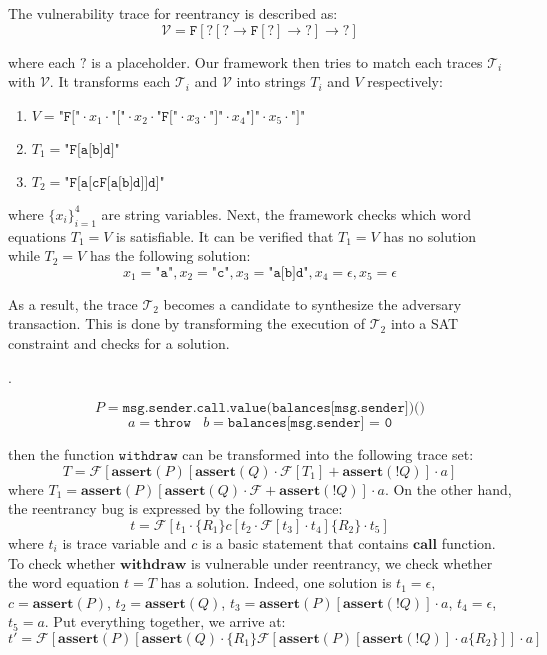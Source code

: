 \documentclass[runningheads]{llncs}
\newcommand{\code}[1]{\texttt{#1}}
\begin{document}
The vulnerability trace for reentrancy is described as:
$$
\mathcal{V} = \code{F}[?[? \rightarrow \code{F}[?] \rightarrow ?] \rightarrow ?]
$$

where each $?$ is a placeholder. Our framework then tries to match each traces $\mathcal{T}_i$ with $\mathcal{V}$. It transforms each $\mathcal{T}_i$ and $\mathcal{V}$ into strings $T_i$ and $V$ respectively:
\begin{enumerate}
	\item $V = \code{"F["} \cdot x_1 \cdot \code{"["} \cdot x_2 \cdot \code{"F["} \cdot x_3 \cdot \code{"]"} \cdot x_4 \code{"]"} \cdot x_5 \cdot  \code{"]"}$
	\item $T_1 = \code{"F[a[b]d]"}$
	\item $T_2 = \code{"F[a[cF[a[b]d]]d]"}$
\end{enumerate}
where $\{x_i\}_{i=1}^4$ are string variables. Next, the framework checks which word equations $T_1 = V$ is satisfiable. It can be verified that $T_1 = V$ has no solution while $T_2 = V$ has the following solution:
$$
x_1 = \code{"a"}, x_2 =  \code{"c"}, x_3 = \code{"a[b]d"}, x_4 = \epsilon, x_5 = \epsilon
$$

As a result, the trace $\mathcal{T}_2$ becomes a candidate to synthesize the adversary transaction. This is done by transforming the execution of $\mathcal{T}_2$ into a SAT constraint and checks for a solution.

.

$$P = \texttt{msg.sender.call.value(balances[msg.sender])()}$$
$$
a = \texttt{throw}~~~~b = \texttt{balances[msg.sender] = 0}
$$

then the function $\texttt{withdraw}$ can be transformed into the following trace set:
$$
T = \mathcal{F}[\textbf{assert}(P)[\textbf{assert}(Q) \cdot \mathcal{F}[T_1]+\textbf{assert}(!Q)] \cdot a]
$$
where $T_1 = \textbf{assert}(P)[\textbf{assert}(Q) \cdot \mathcal{F}+\textbf{assert}(!Q)] \cdot a$. On the other hand, the reentrancy bug is expressed by the following trace:
$$
t = \mathcal{F}[t_1 \cdot \{R_1\}c[t_2 \cdot \mathcal{F}[t_3] \cdot t_4]\{R_2\} \cdot t_5]
$$
where  $t_i$ is trace variable and  $c$ is a basic statement that contains $\textbf{call}$ function. To check whether $\textbf{withdraw}$ is vulnerable under reentrancy, we check whether the word equation $t = T$ has a solution. Indeed, one solution is $t_1 = \epsilon$, $c = \textbf{assert}(P)$, $t_2 = \textbf{assert}(Q)$, $t_3 = \textbf{assert}(P)[\textbf{assert}(!Q)] \cdot a$, $t_4 = \epsilon$, $t_5 = a$. Put everything together, we arrive at:
$$
t' = \mathcal{F}[\textbf{assert}(P)[\textbf{assert}(Q) \cdot \{R_1\}\mathcal{F}[\textbf{assert}(P)[\textbf{assert}(!Q)] \cdot a\{R_2\}]] \cdot a]
$$
\end{document}
